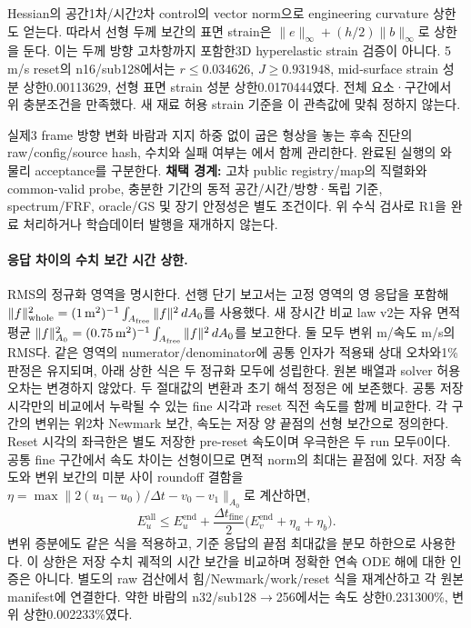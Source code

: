 \documentclass[10pt]{article}
\begin{document}
Hessian의 공간1차/시간2차 control의 vector norm으로 engineering curvature 상한도 얻는다.
따라서 선형 두께 보간의 표면 strain은
\(\|e\|_\infty+(h/2)\|b\|_\infty\)로 상한을 둔다.
이는 두께 방향 고차항까지 포함한3D hyperelastic strain 검증이 아니다.
5 m/s reset의 n16/sub128에서는 \(r\le0.034626\), \(J\ge0.931948\),
mid-surface strain 성분 상한0.00113629, 선형 표면 strain 성분 상한0.0170444였다.
전체 요소·구간에서 위 충분조건을 만족했다. 새 재료 허용 strain 기준을 이 관측값에 맞춰 정하지 않는다.

실제3 frame 방향 변화 바람과 지지 하중 없이 굽은 형상을 놓는 후속 진단의 raw/config/source hash,
수치와 실패 여부는 에서 함께 관리한다.
완료된 실행의 와 물리 acceptance를 구분한다.
\textbf{채택 경계:} 고차 public registry/map의 직렬화와 common-valid probe, 충분한 기간의
동적 공간/시간/방향·독립 기준, spectrum/FRF, oracle/GS 및 장기 안정성은 별도 조건이다.
위 수식 검사로 R1을 완료 처리하거나 학습데이터 발행을 재개하지 않는다.

\paragraph{응답 차이의 수치 보간 시간 상한.}
RMS의 정규화 영역을 명시한다. 선행 단기 보고서는 고정 영역의 영 응답을 포함해
\(\|f\|_{\rm whole}^2=(1\,\mathrm{m}^2)^{-1}\int_{A_{\rm free}}\|f\|^2\,dA_0\)를 사용했다.
새 장시간 비교 law v2는 자유 면적 평균
\(\|f\|_{A_0}^2=(0.75\,\mathrm{m}^2)^{-1}\int_{A_{\rm free}}\|f\|^2\,dA_0\)를 보고한다.
둘 모두 변위 m/속도 m/s의 RMS다. 같은 영역의 numerator/denominator에 공통 인자가 적용돼
상대 오차와1\% 판정은 유지되며, 아래 상한 식은 두 정규화 모두에 성립한다.
원본 배열과 solver 허용오차는 변경하지 않았다. 두 절대값의 변환과 초기 해석 정정은
에 보존했다.
공통 저장 시각만의 비교에서 누락될 수 있는 fine 시각과 reset 직전 속도를 함께 비교한다.
각 구간의 변위는 위2차 Newmark 보간, 속도는 저장 양 끝점의 선형 보간으로 정의한다.
Reset 시각의 좌극한은 별도 저장한 pre-reset 속도이며 우극한은 두 run 모두0이다.
공통 fine 구간에서 속도 차이는 선형이므로 면적 norm의 최대는 끝점에 있다.
저장 속도와 변위 보간의 미분 사이 roundoff 결함을
\(\eta=\max\|2(u_1-u_0)/\Delta t-v_0-v_1\|_{A_0}\)로 계산하면,
\[
 E_u^{\mathrm{all}}\le E_u^{\mathrm{end}}+
 \frac{\Delta t_{\mathrm{fine}}}{2}
 \bigl(E_v^{\mathrm{end}}+\eta_a+\eta_b\bigr).
\]
변위 증분에도 같은 식을 적용하고, 기준 응답의 끝점 최대값을 분모 하한으로 사용한다.
이 상한은 저장 수치 궤적의 시간 보간을 비교하며 정확한 연속 ODE 해에 대한 인증은 아니다.
별도의 raw 검산에서 힘/Newmark/work/reset 식을 재계산하고 각 원본 manifest에 연결한다.
약한 바람의 n32/sub128$\to$256에서는 속도 상한0.231300\%, 변위 상한0.002233\%였다.
\end{document}
